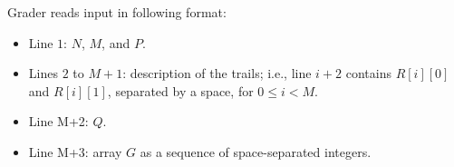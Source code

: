Grader reads input in following format:
\begin{itemize}
\item Line $1$: $N$, $M$, and $P$.
\item Lines $2$ to $M+1$: description of the trails; i.e., line $i+2$ contains $R[i][0]$ and $R[i][1]$, separated by a space, for $0 \le i < M$.
\item Line M+2: $Q$.
\item Line M+3: array $G$ as a sequence of space-separated integers.
\end{itemize}